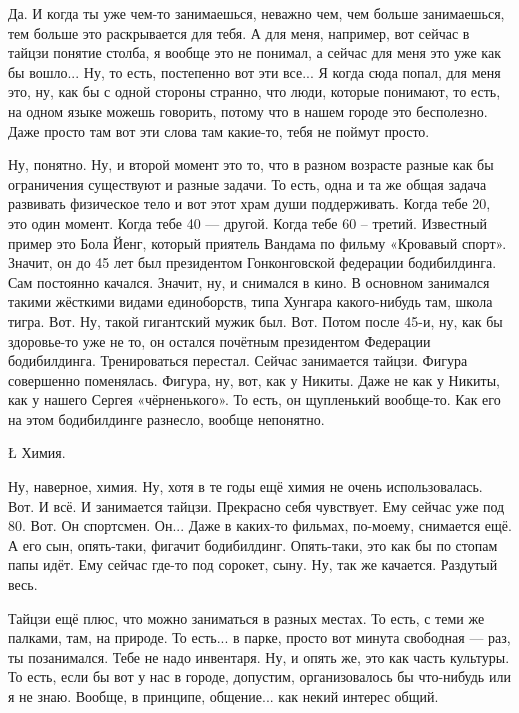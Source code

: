 \I
Да. И когда ты уже
чем-то занимаешься, неважно чем,
чем больше занимаешься, тем больше
это раскрывается для тебя.
А для меня, например,
вот сейчас в тайцзи
понятие столба, я вообще
это не понимал, а сейчас для меня
это уже как бы вошло... Ну, то есть,
постепенно вот эти все...
Я когда сюда попал, для меня это,
ну, как бы с одной стороны странно,
что люди, которые
понимают, то есть, на
одном языке можешь говорить,
потому что в нашем городе это бесполезно.
Даже просто там вот эти слова
там какие-то, тебя не поймут просто.

\A
Ну, понятно.
Ну, и второй момент это то, что
в разном возрасте разные
как бы ограничения
существуют и разные задачи.
То есть, одна и та же
общая задача
развивать физическое
тело и вот этот храм души
поддерживать.
Когда тебе
20, это
один момент. Когда тебе 40 --- другой.
Когда тебе 60 -- третий.
Известный пример это
Бола Йенг, который
приятель
Вандама по фильму
«Кровавый спорт». Значит,
он до
45 лет
был президентом
Гонконговской федерации бодибилдинга.
Сам постоянно качался.
Значит,
ну, и снимался в кино.
В основном занимался
такими жёсткими видами
единоборств, типа Хунгара
какого-нибудь там, школа тигра.
Вот.
Ну, такой гигантский мужик был.
Вот. Потом
после 45-и,
ну, как бы здоровье-то уже не то,
он
остался почётным
президентом
Федерации бодибилдинга. Тренироваться
перестал. Сейчас
занимается тайцзи.
Фигура совершенно поменялась. Фигура,
ну, вот, как у Никиты.
Даже не как у Никиты,
как у нашего
Сергея «чёрненького».
То есть, он щупленький вообще-то.
Как его на этом бодибилдинге разнесло,
вообще непонятно.

\L
Химия.

\A
Ну, наверное,
химия. Ну, хотя в те годы
ещё химия не очень использовалась.
Вот. И всё. И занимается тайцзи.
Прекрасно себя чувствует. Ему сейчас уже
под 80. Вот. Он спортсмен.
Он... Даже в каких-то фильмах, по-моему, снимается ещё.
А его сын, опять-таки,
фигачит бодибилдинг.
Опять-таки, это как бы
по стопам папы идёт.
Ему сейчас где-то под
сорокет, сыну.
Ну, так же качается.
Раздутый весь.

\I
Тайцзи ещё плюс, что можно заниматься
в разных местах. То есть,
с теми же палками, там,
на природе. То есть...
в парке, просто вот
минута свободная --- раз, ты позанимался.
Тебе не надо инвентаря.
Ну, и опять же, это как часть
культуры. То есть, если бы
вот у нас в городе, допустим,
организовалось бы что-нибудь или я не знаю.
Вообще, в принципе, общение...
как некий интерес общий.

